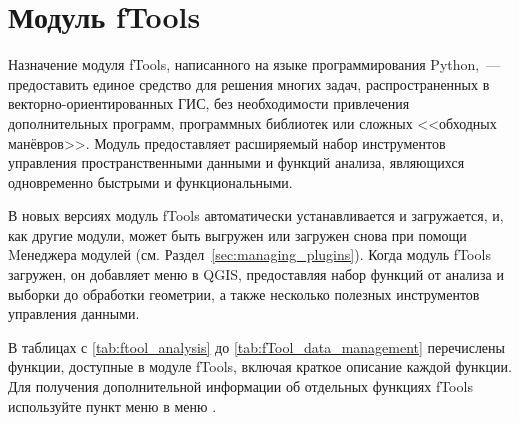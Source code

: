 
\section{Модуль fTools}\label{sec:ftools}



Назначение модуля fTools, написанного на языке программирования
Python,~--- предоставить единое средство для решения многих задач,
распространенных в векторно-ориентированных
ГИС, без необходимости привлечения дополнительных программ, программных
библиотек или сложных <<обходных манёвров>>. Модуль предоставляет расширяемый
набор инструментов управления пространственными данными и функций анализа,
являющихся одновременно быстрыми и функциональными.

В новых версиях \qg модуль fTools автоматически устанавливается и загружается,
и, как другие модули, может быть выгружен или загружен снова при помощи
Mенеджера модулей (см. Раздел~\ref{sec:managing_plugins}). Когда модуль
fTools загружен, он добавляет меню  в QGIS, предоставляя
набор функций от анализа и выборки до обработки геометрии, а также несколько
полезных инструментов управления данными.

\label{ftool_functions}

В таблицах с \ref{tab:ftool_analysis} до \ref{tab:fTool_data_management}
перечислены функции, доступные в модуле fTools, включая краткое описание
каждой функции. Для получения дополнительной информации об отдельных
функциях fTools используйте пункт меню 
в меню .

